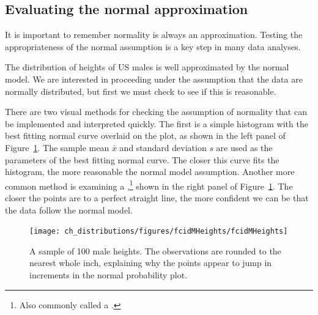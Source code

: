 \subsection{Evaluating the normal approximation}
\label{assessingNormal}

It is important to remember normality is always an approximation. Testing the appropriateness of the normal assumption is a key step in many data analyses.


The distribution of heights of US males is well approximated by the normal model. We are interested in proceeding under the assumption that the data are normally distributed, but first we must check to see if this is reasonable.

There are two visual methods for checking the assumption of normality that can be implemented and interpreted quickly. The first is a simple histogram with the best fitting normal curve overlaid on the plot, as shown in the left panel of Figure~\ref{fcidMHeights}. The sample mean $\bar{x}$ and standard deviation $s$ are used as the parameters of the best fitting normal curve. The closer this curve fits the histogram, the more reasonable the normal model assumption. Another more common method is examining a ,\footnote{Also commonly called a .} shown in the right panel of Figure~\ref{fcidMHeights}. The closer the points are to a perfect straight line, the more confident we can be that the data follow the normal model.

\begin{figure}[ht]
\centering
\texttt{[image: ch\_distributions/figures/fcidMHeights/fcidMHeights]}
\caption{A sample of 100 male heights. The observations are rounded to the nearest whole inch, explaining why the points appear to jump in increments in the normal probability plot.}
\label{fcidMHeights}
\end{figure}


